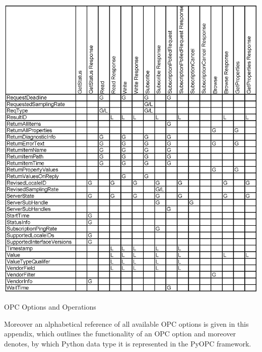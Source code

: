 \begin{table}[!ht]
\centering
\includegraphics[scale=0.9]{graphics/operations2.eps}
\caption{OPC Options and Operations}
\label {operations2} 
\end{table}

Moreover an alphabetical reference of all available OPC options is
given in this appendix, which outlines the functionality of an OPC
option and moreover denotes, by which Python data type it is
represented in the PyOPC framework.


